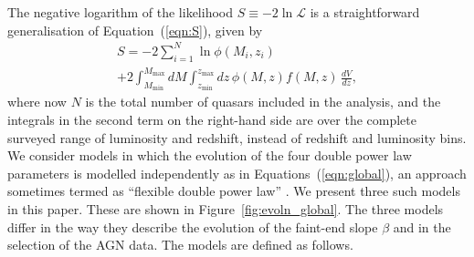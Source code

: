 \documentclass[fleqn,usenatbib]{mnras}
\begin{document}
The negative logarithm of the likelihood $S\equiv -2\ln\mathcal{L}$ is
a straightforward generalisation of Equation~(\ref{eqn:S}), given by
\begin{multline}
  S = -2\sum_{i=1}^N\ln\phi(M_i, z_i)\\+2\int_{M_\mathrm{min}}^{M_\mathrm{max}}dM\int_{z_\mathrm{min}}^{z_\mathrm{max}}dz\, \phi(M,z) f(M, z)\,\frac{dV}{dz},
  \label{eqn:S2}
\end{multline}
where now $N$ is the total number of quasars included in the analysis,
and the integrals in the second term on the right-hand side are over
the complete surveyed range of luminosity and redshift, instead of
redshift and luminosity bins.  We consider models in which the
evolution of the four double power law parameters is modelled
independently as in Equations~(\ref{eqn:global}), an approach
sometimes termed as ``flexible double power law''
\citep{2015MNRAS.451.1892A}.  We present three such models in this
paper.  These are shown in Figure~\ref{fig:evoln_global}.
The three
models differ in the way they describe the evolution of the faint-end
slope $\beta$ and in the selection of the AGN data.  The models are
defined as follows.
\end{document}
